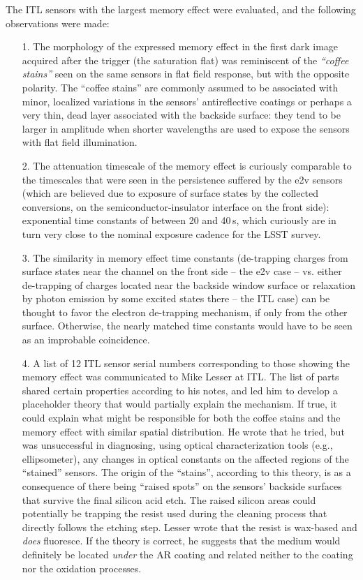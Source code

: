 The ITL sensors with the largest memory effect were evaluated, and the following observations were made:
\begin{itemize}
    \item[1.] The morphology of the expressed memory effect in the first dark image acquired after the trigger (the saturation flat) was reminiscent of the {\it ``coffee stains''} seen on the same sensors in flat field response, but with the opposite polarity. The ``coffee stains'' are commonly assumed to be associated with minor, localized variations in the sensors' antireflective coatings or perhaps a very thin, dead layer associated with the backside surface: they tend to be larger in amplitude when shorter wavelengths are used to expose the sensors with flat field illumination.
    \item[2.] The attenuation timescale of the memory effect is curiously comparable to the timescales that were seen in the persistence suffered by the e2v sensors (which are believed due to exposure of surface states by the collected conversions, on the semiconductor-insulator interface on the front side): exponential time constants of between 20 and 40\,s, which curiously are in turn very close to the nominal exposure cadence for the LSST survey.
    \item[3.] The similarity in memory effect time constants (de-trapping charges from surface states near the channel on the front side -- the e2v case -- vs. either de-trapping of charges located near the backside window surface or relaxation by photon emission by some excited states there -- the ITL case) can be thought to favor the electron de-trapping mechanism, if only from the other surface. Otherwise, the nearly matched time constants would have to be seen as an improbable coincidence.
    \item[4.] A list of 12 ITL sensor serial numbers corresponding to those showing the memory effect was communicated to Mike Lesser at ITL. The list of parts shared certain properties according to his notes, and led him to develop a placeholder theory that would partially explain the mechanism. If true, it could explain what might be responsible for both the coffee stains and the memory effect with similar spatial distribution. He wrote that he tried, but was unsuccessful in diagnosing, using optical characterization tools (e.g., ellipsometer), any changes in optical constants on the affected regions of the ``stained'' sensors. The origin of the ``stains'', according to this theory, is as a consequence of there being ``raised spots'' on the sensors' backside surfaces that survive the final silicon acid etch. The raised silicon areas could potentially be trapping the resist used during the cleaning process that directly follows the etching step. Lesser wrote that the resist is wax-based and {\it does} fluoresce. If the theory is correct, he suggests that the medium would definitely be located {\it under} the AR coating and related neither to the coating nor the oxidation processes.

\end{itemize}
